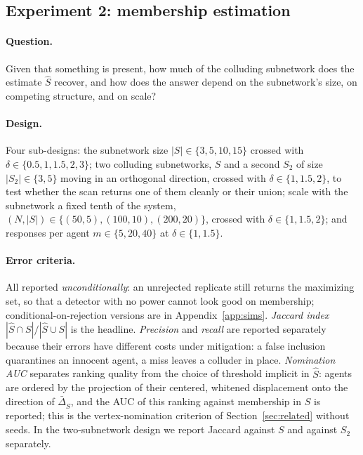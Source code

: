 \subsection{Experiment 2: membership estimation}
\label{sec:exp-member}

\paragraph{Question.} Given that something is present, how much of the colluding subnetwork does the estimate $\hat S$ recover, and how does the answer depend on the subnetwork's size, on competing structure, and on scale?

\paragraph{Design.} Four sub-designs: the subnetwork size $|S|\in\{3,5,10,15\}$ crossed with $\delta\in\{0.5,1,1.5,2,3\}$; two colluding subnetworks, $S$ and a second $S_2$ of size $|S_2|\in\{3,5\}$ moving in an orthogonal direction, crossed with $\delta\in\{1,1.5,2\}$, to test whether the scan returns one of them cleanly or their union; scale with the subnetwork a fixed tenth of the system, $(N,|S|)\in\{(50,5),(100,10),(200,20)\}$, crossed with $\delta\in\{1,1.5,2\}$; and responses per agent $m\in\{5,20,40\}$ at $\delta\in\{1,1.5\}$.

\paragraph{Error criteria.} All reported \emph{unconditionally}: an unrejected replicate still returns the maximizing set, so that a detector with no power cannot look good on membership; conditional-on-rejection versions are in Appendix~\ref{app:sims}. \emph{Jaccard index} $|\hat S\cap S|/|\hat S\cup S|$ is the headline. \emph{Precision} and \emph{recall} are reported separately because their errors have different costs under mitigation: a false inclusion quarantines an innocent agent, a miss leaves a colluder in place. \emph{Nomination AUC} separates ranking quality from the choice of threshold implicit in $\hat S$: agents are ordered by the projection of their centered, whitened displacement onto the direction of $\bar\Delta_{\hat S}$, and the AUC of this ranking against membership in $S$ is reported; this is the vertex-nomination criterion of Section~\ref{sec:related} without seeds. In the two-subnetwork design we report Jaccard against $S$ and against $S_2$ separately.

